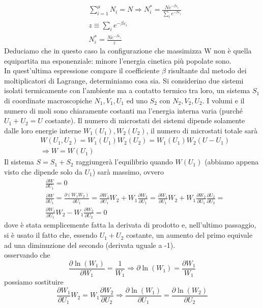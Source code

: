 \documentclass[
10pt, %
a4paper, %
oneside, %
headinclude,footinclude, %
BCOR5mm, %
]{scrartcl}
\begin{document}
\begin{align*}
	&\sum_{i=1}^\mu N_i = N \Rightarrow N_i^* = \frac{Ne^{-\beta\varepsilon_i}}{\sum_ie^{-\beta\varepsilon_i}}\\
	&z\equiv \sum_ie^{-\beta\varepsilon_i}\\
	&N_i^* = \frac{Ne^{-\beta\varepsilon_i}}{z}
\end{align*} 
Deduciamo che in questo caso la configurazione che massimizza W non è quella equipartita ma esponenziale: minore l'energia cinetica più popolate sono. \\
In quest'ultima espressione compare il coefficiente $\beta$ risultante dal metodo dei moltiplicatori di Lagrange, determiniamo cosa sia. Si considerino due sistemi isolati termicamente con l'ambiente ma a contatto termico tra loro, un sistema \(S_1\) di coordinate macroscopiche \(N_1, V_1, U_1\) ed uno \(S_2\) con \(N_2,V_2,U_2\). I volumi e il numero di moli sono chiaramente costanti ma l'energia interna varia (purché \(U_1+U_2 = U\) costante). Il numero di microstati dei sistemi dipende solamente dalle loro energie interne \(W_1(U_1), W_2(U_2)\), il numero di microstati totale sarà 
\begin{align*}
	&W(U_1,U_2) = W_1(U_1)W_2(U_2)=W_1(U_1)W_2(U-U_1)\\
	&\Rightarrow W = W(U_1)
\end{align*} 
Il sistema \(S=S_1+S_2\) raggiungerà l'equilibrio quando \(W(U_1)\) (abbiamo appena visto che dipende solo da \(U_1\)) sarà massimo, ovvero
\begin{align*}
	&\frac{\partial W}{\partial U_1}=0\\
	&\frac{\partial W}{\partial U_1}=\frac{\partial (W_1W_2)}{\partial U_1}=\frac{\partial W_1}{\partial U_1}W_2+W_1\frac{\partial W_2}{\partial U_1}=\frac{\partial W_1}{\partial U_1}W_2+W_1\frac{\partial W_2}{\partial U_1}\frac{\partial U_2}{\partial U_2}=\\
	&\frac{\partial W_1}{\partial U_1}W_2-W_1\frac{\partial W_2}{\partial U_2}=0
\end{align*} 
dove è stata semplicemente fatta la derivata di prodotto e, nell'ultimo passaggio, si è usato il fatto che, essendo \(U_1+U_2 \) costante, un aumento del primo equivale ad una diminuzione del secondo (derivata uguale a -1).\\
osservando che 
\[\frac{\partial \ln(W_1)}{\partial W_1}=\frac{1}{W_1}\Rightarrow \partial \ln(W_1)=\frac{\partial W_1}{W_1}\]
possiamo sostituire 
\[\frac{\partial W_1}{\partial U_1}W_2 = W_1\frac{\partial W_2}{\partial U_2} \Rightarrow \frac{\partial \ln(W_1)}{\partial U_1} = \frac{\partial \ln(W_2)}{\partial U_2}\]
\end{document}
